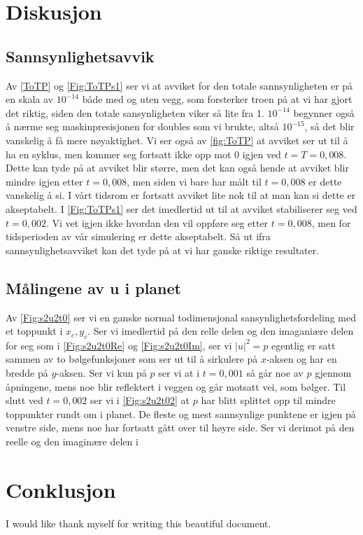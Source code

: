 \documentclass[reprint,english,notitlepage]{revtex4-2}  %
\begin{document}
\section{Diskusjon}
\subsection{Sannsynlighetsavvik}
Av \autoref{ToTP} og \autoref{Fig:ToTPs1} ser vi at avviket for den totale sannsynligheten er på en skala av $10^{-14}$ både med og uten vegg, som forsterker troen på at vi har gjort det riktig, siden den totale sansynligheten viker så lite fra 1. $10^{-14}$ begynner også å nærme seg maskinpresisjonen for doubles som vi brukte, altså $10^{-15}$, så det blir vanskelig å få mere nøyaktighet. Vi ser også av \ref{fig:ToTP} at avviket ser ut til å ha en syklus, men kommer seg fortsatt ikke opp mot 0 igjen ved $t=T=0,008$. Dette kan tyde på at avviket blir større, men det kan også hende at avviket blir mindre igjen etter $t=0,008$, men siden vi bare har målt til $t=0,008$ er dette vanskelig å si. I vårt tidsrom er fortsatt avviket lite nok til at man kan si dette er akseptabelt. I \autoref{Fig:ToTPs1} ser det imedlertid ut til at avviket stabiliserer seg ved $t=0,002$. Vi vet igjen ikke hvordan den vil oppføre seg etter $t=0,008$, men for tidsperioden av vår simulering er dette akseptabelt. Så ut ifra sannsynlighetsavviket kan det tyde på at vi har ganske riktige resultater. 
\subsection{Målingene av u i planet}
Av \autoref{Fig:s2u2t0} ser vi en ganske normal todimensjonal sansynlighetsfordeling med et toppunkt i $x_c, y_c$. Ser vi imedlertid på den relle delen og den imaganiære delen for seg som i \autoref{Fig:s2u2t0Re} og \autoref{Fig:s2u2t0Im}, ser vi $|u|^2=p$ egentlig er satt sammen av to bølgefunksjoner som ser ut til å sirkulere på $x$-aksen og har en bredde på $y$-aksen. Ser vi kun på $p$ ser vi at i $t=0,001$ så går noe av $p$ gjennom åpningene, mens noe blir reflektert i veggen og går motsatt vei, som bølger. Til slutt ved $t=0,002$ ser vi i \autoref{Fig:s2u2t02} at $p$ har blitt splittet opp til mindre toppunkter rundt om i planet. De fleste og mest sannsynlige punktene er igjen på venstre side, mens noe har fortsatt gått over til høyre side.
\newline
Ser vi derimot på den reelle og den imaginære delen i 
\section{Conklusjon}
\begin{acknowledgments}  %
I would like thank myself for writing this beautiful document.
\end{acknowledgments}
\end{document}
